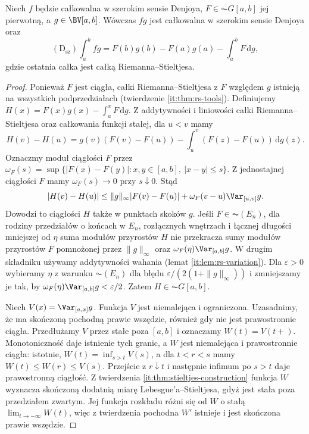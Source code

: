 \begin{twierdzenie}\label{ma1:kh:thm:wide-denjoy-multiplier}
Niech $f$ będzie całkowalna w szerokim sensie Denjoya, $F\in\AC G[a,b]$ jej pierwotną, a $g\in\BV[a,b]$. Wówczas $fg$ jest całkowalna w szerokim sensie Denjoya oraz
\[
 (\mathrm D_{\mathrm{sz}})\int_a^b fg
 =F(b)g(b)-F(a)g(a)-\int_a^b F\,\mathrm dg,
\]
gdzie ostatnia całka jest całką Riemanna--Stieltjesa.
\end{twierdzenie}
\begin{proof}
Ponieważ $F$ jest ciągła, całki Riemanna--Stieltjesa z $F$ względem $g$ istnieją na wszystkich podprzedziałach (twierdzenie \ref{it:thm:rs-tools}). Definiujemy
$H(x)=F(x)g(x)-\int_a^x F\,\mathrm dg$.
Z addytywności i liniowości całki Riemanna--Stieltjesa oraz całkowania funkcji stałej, dla $u<v$ mamy
\[
 H(v)-H(u)=g(v)(F(v)-F(u))-\int_u^v(F(z)-F(u))\,\mathrm dg(z).
\]
Oznaczmy moduł ciągłości $F$ przez $\omega_F(s)=\sup\{|F(x)-F(y)|:x,y\in[a,b],\ |x-y|\le s\}$. Z jednostajnej ciągłości $F$ mamy $\omega_F(s)\to0$ przy $s\downarrow0$. Stąd
\[
 |H(v)-H(u)|\le \|g\|_\infty |F(v)-F(u)|
   +\omega_F(v-u)\Var_{[u,v]}g.
\]
Dowodzi to ciągłości $H$ także w punktach skoków $g$. Jeśli $F\in\AC(E_n)$, dla rodziny przedziałów o końcach w $E_n$, rozłącznych wnętrzach i łącznej długości mniejszej od $\eta$ suma modułów przyrostów $H$ nie przekracza sumy modułów przyrostów $F$ pomnożonej przez $\|g\|_\infty$ oraz $\omega_F(\eta)\Var_{[a,b]}g$. W drugim składniku używamy addytywności wahania (lemat \ref{it:lem:rs-variation}). Dla $\varepsilon>0$ wybieramy $\eta$ z warunku $\AC(E_n)$ dla błędu $\varepsilon/(2(1+\|g\|_\infty))$ i zmniejszamy je tak, by $\omega_F(\eta)\Var_{[a,b]}g<\varepsilon/2$. Zatem $H\in\AC G[a,b]$.

Niech $V(x)=\Var_{[a,x]}g$. Funkcja $V$ jest
niemalejąca i ograniczona. Uzasadnimy, że ma skończoną
pochodną prawie wszędzie, również gdy nie jest
prawostronnie ciągła. Przedłużamy $V$ przez stałe
poza $[a,b]$ i oznaczamy $W(t)=V(t+)$.
Monotoniczność daje istnienie tych granic, a $W$
jest niemalejąca i prawostronnie ciągła: istotnie,
$W(t)=\inf_{s>t}V(s)$, a dla $t<r<s$ mamy
$W(t)\le W(r)\le V(s)$. Przejście z $r\downarrow t$
i następnie infimum po $s>t$ daje prawostronną
ciągłość. Z twierdzenia \ref{it:thm:stieltjes-construction}
funkcja $W$ wyznacza skończoną dodatnią miarę
Lebesgue'a--Stieltjesa, gdyż jest stała poza przedziałem
zwartym. Jej funkcja rozkładu różni się od $W$
o stałą $\lim_{t\to-\infty}W(t)$, więc z twierdzenia
 pochodna $W'$ istnieje
i jest skończona prawie wszędzie.


\end{proof}
